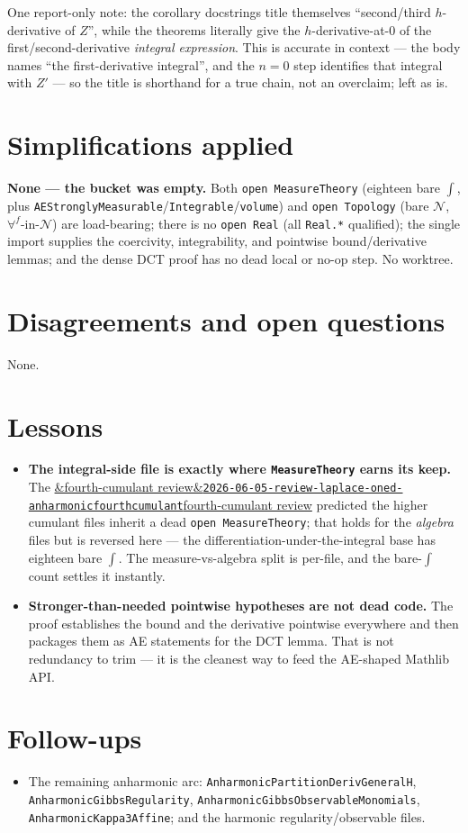 \documentclass[11pt]{article}
\newcommand{\reviewref}[2][]{\href{https://therisensea.org/reviews/#2/}{\ifx&#1&\texttt{#2}\else#1\fi}}
\begin{document}
One report-only note: the corollary docstrings title themselves ``second/third $h$-derivative of
$Z$'', while the theorems literally give the $h$-derivative-at-$0$ of the first/second-derivative
\emph{integral expression}. This is accurate in context --- the body names ``the first-derivative
integral'', and the $n=0$ step identifies that integral with $Z'$ --- so the title is shorthand for
a true chain, not an overclaim; left as is.

\section{Simplifications applied}
\textbf{None --- the bucket was empty.} Both \texttt{open MeasureTheory} (eighteen bare $\int$, plus
\texttt{AEStronglyMeasurable}/\texttt{Integrable}/\texttt{volume}) and \texttt{open Topology} (bare
$\mathcal N$, $\forall^f$-in-$\mathcal N$) are load-bearing; there is no \texttt{open Real} (all
\texttt{Real.*} qualified); the single import supplies the coercivity, integrability, and pointwise
bound/derivative lemmas; and the dense DCT proof has no dead local or no-op step. No worktree.

\section{Disagreements and open questions}
None.

\section{Lessons}
\begin{itemize}[noitemsep]
  \item \textbf{The integral-side file is exactly where \texttt{MeasureTheory} earns its keep.} The
    \reviewref[fourth-cumulant review]{2026-06-05-review-laplace-oned-anharmonicfourthcumulant}
    predicted the higher cumulant files inherit a dead \texttt{open MeasureTheory}; that holds for
    the \emph{algebra} files but is reversed here --- the differentiation-under-the-integral base
    has eighteen bare $\int$. The measure-vs-algebra split is per-file, and the bare-$\int$ count
    settles it instantly.
  \item \textbf{Stronger-than-needed pointwise hypotheses are not dead code.} The proof establishes
    the bound and the derivative pointwise everywhere and then packages them as AE statements for
    the DCT lemma. That is not redundancy to trim --- it is the cleanest way to feed the AE-shaped
    Mathlib API.
\end{itemize}

\section{Follow-ups}
\begin{itemize}[noitemsep]
  \item The remaining anharmonic arc: \texttt{AnharmonicPartitionDerivGeneralH},
    \texttt{AnharmonicGibbsRegularity}, \texttt{AnharmonicGibbsObservableMonomials},
    \texttt{AnharmonicKappa3Affine}; and the harmonic regularity/observable files.
\end{itemize}
\end{document}
